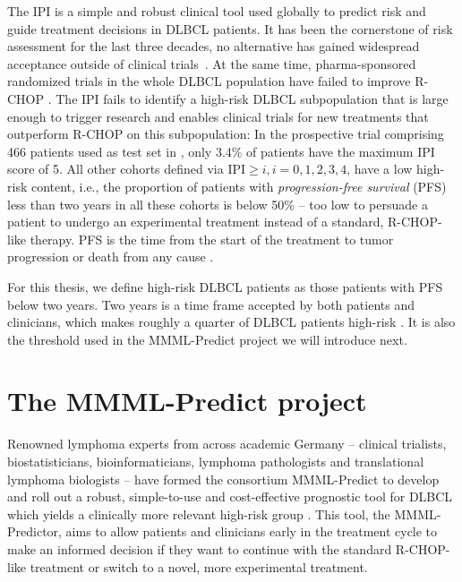 The IPI is a simple and robust clinical tool used globally to predict risk and guide 
treatment decisions in DLBCL patients. It has been the cornerstone of risk assessment for the last 
three decades, no alternative has gained widespread acceptance outside of clinical 
trials~\citep{ipi-stay-strong}. 
At the same time, pharma-sponsored randomized trials in the whole DLBCL population have failed to
improve R-CHOP \cite{susanibar21}. The IPI fails to identify a high-risk DLBCL subpopulation that is 
large enough to trigger research and enables clinical trials for new treatments that outperform 
R-CHOP on this subpopulation: In the prospective trial comprising \num{466} patients used as test 
set in \citep{staiger20}, only \num{3.4}\% of patients have the maximum IPI score of 5. All other 
cohorts defined via $\text{IPI} \geq i, i = 0, 1, 2, 3, 4$, have a low high-risk content, i.e.,  
the proportion of patients with 
\textit{progression-free survival} (PFS) less than two years in all these cohorts is below 
\num{50}\% -- too low to 
persuade a patient to undergo an experimental treatment instead of a standard, R-CHOP-like therapy. 
PFS is the time from the start of the treatment to tumor progression or death from any cause 
\cite{saad09}.

For this thesis, we define high-risk DLBCL patients as those patients with PFS below two years. 
Two years is a time 
frame accepted by both patients and clinicians, which makes roughly a quarter of DLBCL patients 
high-risk \cite{staiger20}. It is also the threshold used in the MMML-Predict project we will 
introduce next.

\section{The MMML-Predict project} \label{sec:intro-mmml}

Renowned lymphoma experts from across academic Germany -- clinical trialists, biostatisticians, 
bioinformaticians, lymphoma pathologists and translational lymphoma biologists -- have formed the 
consortium MMML-Predict to develop and roll out a robust, simple-to-use and cost-effective 
prognostic tool for DLBCL 
which yields a clinically more relevant high-risk group \cite{mmml-chapuy,mmml-idw}. This tool, the 
MMML-Predictor, aims to allow
patients and clinicians early in the treatment cycle to make an informed decision if they want to 
continue with the standard R-CHOP-like treatment or switch to a novel, more experimental treatment. 

